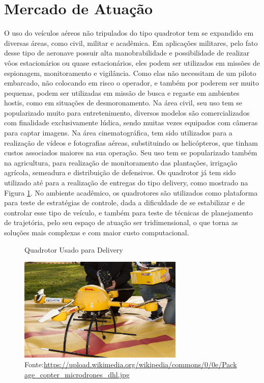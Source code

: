 \section{Mercado de Atuação}

O uso do veículos aéreos não tripulados do tipo quadrotor tem se expandido em diversas áreas, como civil, militar e acadêmica. Em aplicações militares, pelo fato desse tipo de aeronave possuir alta manobrabilidade e possibilidade de realizar vôos estacionários ou quase estacionários, eles podem ser utilizados em missões de espionagem, monitoramento e vigilância. Como elas não necessitam de um piloto embarcado, não colocando em risco o operador, e também por poderem ser muito pequenas, podem ser utilizadas em missão de busca e regaste em ambientes hostis, como em situações de desmoronamento. Na área civil, seu uso tem se popularizado muito para entretenimento, diversos modelos são comercializados com finalidade exclusivamente lúdica, sendo muitas vezes equipados com câmeras para captar imagens. Na área cinematográfica, tem sido utilizados para a realização de vídeos e fotografias aéreas, substituindo os helicópteros, que tinham custos associados maiores na sua operação. Seu uso tem se popularizado também na agricultura, para realização de monitoramento das plantações, irrigação agrícola, semeadura e distribuição de defensivos. Os quadrotor já tem sido utilizado até para a realização de entregas do tipo delivery, como mostrado na Figura \ref{fig:delivery}. No ambiente acadêmico, os quadrotores são utilizados como plataforma para teste de estratégias de controle, dada a dificuldade de se estabilizar e de controlar esse tipo de veículo, e também para teste de técnicas de planejamento de trajetória, pelo seu espaço de atuação ser tridimensional, o que torna as soluções mais complexas e com maior custo computacional.

\begin{figure} [h!]	
  \centering
  {
  \caption{Quadrotor Usado para Delivery}
  \includegraphics[width=0.7\textwidth]{Figures/Package_copter_microdrones_dhl.jpg}
  \caption*{Fonte:\url{https://upload.wikimedia.org/wikipedia/commons/0/0e/Package_copter_microdrones_dhl.jpg}}
  \label{fig:delivery}
  }
\end{figure}

